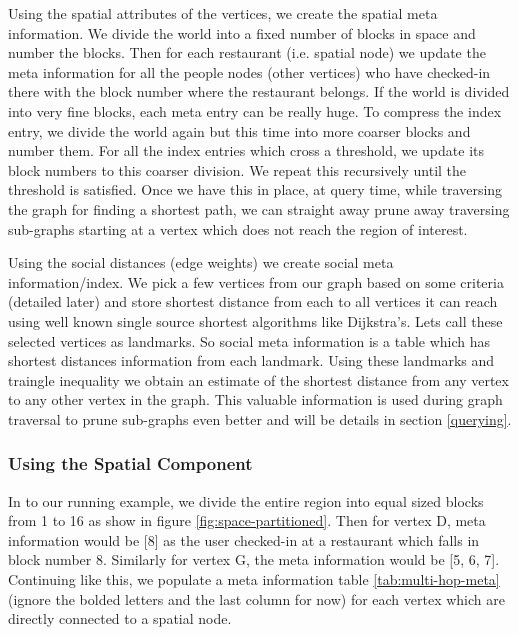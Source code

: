 Using the spatial attributes of the vertices, we create the spatial meta information. We divide the world into a fixed number of blocks in space and number the blocks. Then for each restaurant (i.e. spatial node) we update the meta information for all the people nodes (other vertices) who have checked-in there with the block number where the restaurant belongs. If the world is divided into very fine blocks, each meta entry can be really huge. To compress the index entry, we divide the world again but this time into more coarser blocks and number them. For all the index entries which cross a threshold, we update its block numbers to this coarser division. We repeat this recursively until the threshold is satisfied. Once we have this in place, at query time, while traversing the graph for finding a shortest path, we can straight away prune away traversing sub-graphs starting at a vertex which does not reach the region of interest.

Using the social distances (edge weights) we create social meta information/index. We pick a few vertices from our graph based on some criteria (detailed later) and store shortest distance from each to all vertices it can reach using well known single source shortest algorithms like Dijkstra's. Lets call these selected vertices as landmarks. So social meta information is a table which has shortest distances information from each landmark. Using these landmarks and traingle inequality we obtain an estimate of the shortest distance from any vertex to any other vertex in the graph. This valuable information is used during graph traversal to prune sub-graphs even better and will be details in section \ref{querying}.

\subsubsection{Using the Spatial Component}
In to our running example, we divide the entire region into equal sized blocks from 1 to 16 as show in figure \ref{fig:space-partitioned}. Then for vertex D, meta information would be {[}8{]} as the user checked-in at a restaurant which falls in block number 8. Similarly for vertex G, the meta information would be {[}5, 6, 7{]}. Continuing like this, we populate a meta information table \ref{tab:multi-hop-meta} (ignore the bolded letters and the last column for now) for each vertex which are directly connected to a spatial node.

